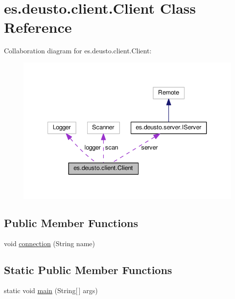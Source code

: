 \hypertarget{classes_1_1deusto_1_1client_1_1_client}{}\section{es.\+deusto.\+client.\+Client Class Reference}
\label{classes_1_1deusto_1_1client_1_1_client}


Collaboration diagram for es.\+deusto.\+client.\+Client\+:
\nopagebreak
\begin{figure}[H]
\begin{center}
\leavevmode
\includegraphics[width=340pt]{classes_1_1deusto_1_1client_1_1_client__coll__graph}
\end{center}
\end{figure}
\subsection*{Public Member Functions}
\begin{DoxyCompactItemize}
\item 
void \hyperlink{classes_1_1deusto_1_1client_1_1_client_a7a7fe3b9a2360883bd7697efe69816dc}{connection} (String name)
\end{DoxyCompactItemize}
\subsection*{Static Public Member Functions}
\begin{DoxyCompactItemize}
\item 
static void \hyperlink{classes_1_1deusto_1_1client_1_1_client_a69a7526d0af9cb2341f4bf341b501152}{main} (String\mbox{[}$\,$\mbox{]} args)
\end{DoxyCompactItemize}
